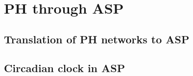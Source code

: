 
\section{PH through ASP}
\label{sec:ph-asp}
\subsection{Translation of PH networks to ASP}

\subsection{Circadian clock in ASP}
	